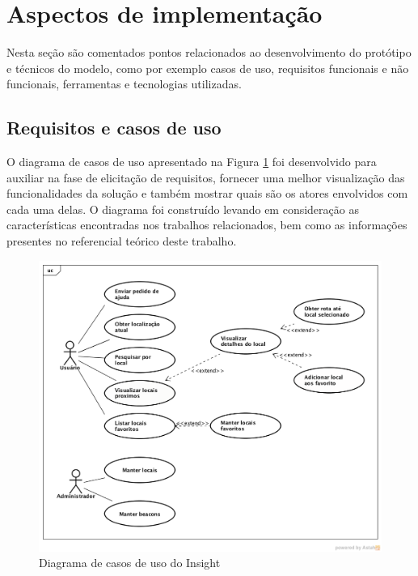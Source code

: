 \documentclass[english,brazilian]{UNISINOSmonografia}
\begin{document}
	\section{Aspectos de implementação}
Nesta seção são comentados pontos relacionados ao desenvolvimento do protótipo e técnicos do modelo, como por exemplo casos de uso, requisitos funcionais e não funcionais, ferramentas e tecnologias utilizadas.

	\subsection{Requisitos e casos de uso}  
O diagrama de casos de uso apresentado na Figura \ref{fig:diagramaCasosDeUso} foi desenvolvido para auxiliar na fase de elicitação de requisitos, fornecer uma melhor visualização das funcionalidades da solução e também mostrar quais são os atores envolvidos com cada uma delas. O diagrama foi construído levando em consideração as características encontradas nos trabalhos relacionados, bem como as informações presentes no referencial teórico deste trabalho.


\begin{figure}[!ht]
	\caption{Diagrama de casos de uso do Insight}
	\label{fig:diagramaCasosDeUso}
	\centering%
	\begin{minipage}{,9\textwidth}
		\includegraphics[width=\textwidth]{imgs/casosDeUso}
	\end{minipage}
\end{figure}
	
\end{document}

